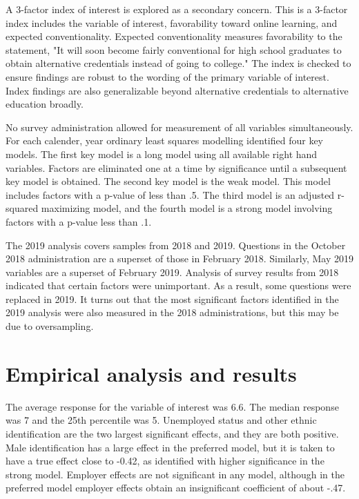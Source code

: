 \documentclass[AER]{./aea-latex-templates/AEA}
\begin{document}
        A 3-factor index of interest is explored as a secondary concern.
        This is a 3-factor index includes the variable of interest, favorability toward online learning,
        and expected conventionality.
        Expected conventionality measures favorability to the statement,
        "It will soon become fairly conventional for high school graduates to obtain alternative credentials
        instead of going to college."
        The index is checked to ensure findings are robust to the wording of the primary variable of interest.
        Index findings are also generalizable beyond alternative credentials to alternative education broadly.
        
        No survey administration allowed for measurement of all variables simultaneously.
        For each calender, year ordinary least squares modelling identified four key models.
        The first key model is a long model using all available right hand variables.
        Factors are eliminated one at a time by significance until a subsequent key model is obtained.
        The second key model is the weak model. This model includes factors with a p-value of less than .5.
        The third model is an adjusted r-squared maximizing model, and the fourth
        model is a strong model involving factors with a p-value less than .1.

        The 2019 analysis covers samples from 2018 and 2019.
        Questions in the October 2018 administration are a superset of those in February 2018.
        Similarly, May 2019 variables are a superset of February 2019.
        Analysis of survey results from 2018 indicated that certain factors were unimportant.
        As a result, some questions were replaced in 2019.
        It turns out that the most significant factors identified in the
        2019 analysis were also measured in the 2018 administrations, but this may be due to oversampling.

        \section{Empirical analysis and results}

        The average response for the variable of interest was 6.6.
        The median response was 7 and the 25th percentile was 5.
        Unemployed status and other ethnic identification are the two largest significant effects,
        and they are both positive.
        Male identification has a large effect in the preferred model, but it is taken to have a true
        effect close to -0.42,
        as identified with higher significance in the strong model.
        Employer effects are not significant in any model, although in the preferred
        model employer effects obtain an insignificant coefficient of about -.47.
\end{document}
